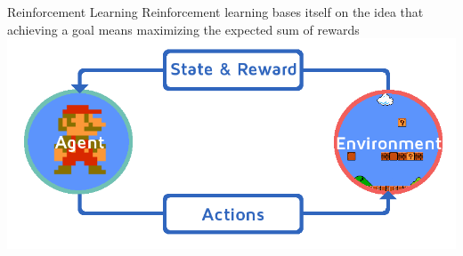 \documentclass[10pt]{beamer}
\begin{document}
\begin{frame}{Reinforcement Learning}
    Reinforcement learning bases itself on the idea that achieving a goal means maximizing the expected sum of rewards \cite{ucl}
    \newline
    \newline
    \includegraphics[width=\textwidth]{sty/Mario.png}
\end{frame}
\end{document}
